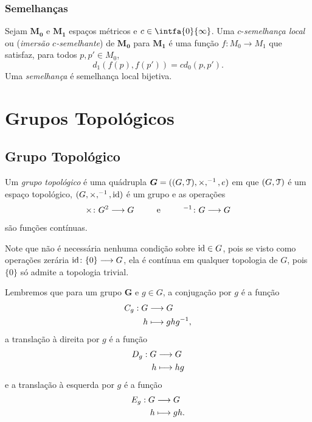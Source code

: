 \subsection{Semelhanças}

\begin{defi}
Sejam $\bm{M_0}$ e $\bm{M_1}$ espaços métricos e $c \in \intfa{0}{\infty}$. Uma $c$-\emph{semelhança local} ou (\emph{imersão $c$-semelhante}) de $\bm{M_0}$ para $\bm{M_1}$ é uma função $f\colon M_0 \to M_1$ que satisfaz, para todos $p,p' \in M_0$,
	\begin{equation*}
	d_1(f(p),f(p')) = c d_0(p,p').
	\end{equation*}
Uma \emph{semelhança} é semelhança local bijetiva.
\end{defi}







\chapter{Grupos Topológicos}

\section{Grupo Topológico}

\begin{defi}
Um \emph{grupo topológico} é uma quádrupla $\bm G = ((G,\mathcal{T}),\times,^{-1},e)$ em que $(G,\mathcal{T})$ é um espaço topológico, $(G,\times,^{-1},\mathrm{id})$ é um grupo e as operações
	\begin{equation*}
	\times\colon G^2 \longrightarrow G \qquad\text{\ \ e\ \ }\qquad ^{-1}\colon G \longrightarrow G
	\end{equation*}
são funções contínuas.%
\end{defi}

Note que não é necessária nenhuma condição sobre $\mathrm{id} \in G$, pois se visto como operações zerária $\mathrm{id}\colon \{0\} \longrightarrow G$, ela é contínua em qualquer topologia de $G$, pois $\{0\}$ só admite a topologia trivial.

Lembremos que para um grupo $\bm G$ e $g \in G$, a conjugação por $g$ é a função
	\begin{align*}
	{C_g}: {G} &\longrightarrow {G} \\{h} &\longmapsto {ghg^{-1}},
	\end{align*}
a translação à direita por $g$ é a função
	\begin{align*}
	{D_g}: {G} &\longrightarrow {G} \\{h} &\longmapsto {hg}
	\end{align*}
e a translação à esquerda por $g$ é a função
	\begin{align*}
	{E_g}: {G} &\longrightarrow {G} \\{h} &\longmapsto {gh}.
	\end{align*}

